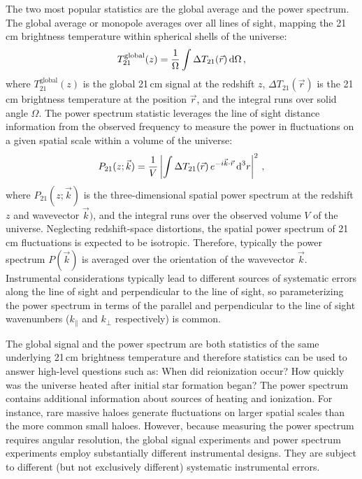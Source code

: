 \begin{bibunit}
The two most popular statistics are the global average and the power spectrum. The global average or
monopole averages over all lines of sight, mapping the 21\,cm brightness temperature within
spherical shells of the universe:
\begin{equation}
    T^\text{global}_{21}(z) = \frac{1}{\Omega}\int \Delta T_{21}(\vec{r}) \, {\textrm d}\Omega \,,
\end{equation}
where $T^\text{global}_{21}(z)$ is the global 21\,cm signal at the redshift $z$, $\Delta
T_{21}(\vec{r})$ is the 21\,cm brightness temperature at the position $\vec{r}$, and the integral
runs over solid angle $\Omega$.  The power spectrum statistic leverages the line of sight distance
information from the observed frequency to measure the power in fluctuations on a given spatial
scale within a volume of the universe:
\begin{equation}
    P_{21}(z; \vec{k}) =
        \frac{1}{V}\left|
        \int \Delta T_{21}(\vec{r}) \, e^{-i\vec{k}\cdot\vec{r}} \, {\textrm d}^3r
        \right|^2\,,
\end{equation}
where $P_{21}(z; \vec{k})$ is the three-dimensional spatial power spectrum at the redshift $z$ and
wavevector $\vec{k})$, and the integral runs over the observed volume $V$ of the universe.
Neglecting redshift-space distortions, the spatial power spectrum of 21\,cm fluctuations is expected
to be isotropic. Therefore, typically the power spectrum $P(\vec{k})$ is averaged over the
orientation of the wavevector $\vec{k}$. Instrumental considerations typically lead to different
sources of systematic errors along the line of sight and perpendicular to the line of sight, so
parameterizing the power spectrum in terms of the parallel and perpendicular to the line of sight
wavenumbers ($k_\parallel$ and $k_\perp$ respectively) is common.

The global signal and the power spectrum are both statistics of the same underlying 21\,cm
brightness temperature and therefore statistics can be used to answer high-level questions such as:
When did reionization occur? How quickly was the universe heated after initial star formation began?
The power spectrum contains additional information about sources of heating and ionization. For
instance, rare massive haloes generate fluctuations on larger spatial scales than the more common
small haloes.  However, because measuring the power spectrum requires angular resolution, the global
signal experiments and power spectrum experiments employ substantially different instrumental
designs. They are subject to different (but not exclusively different) systematic instrumental
errors.


\end{bibunit}
